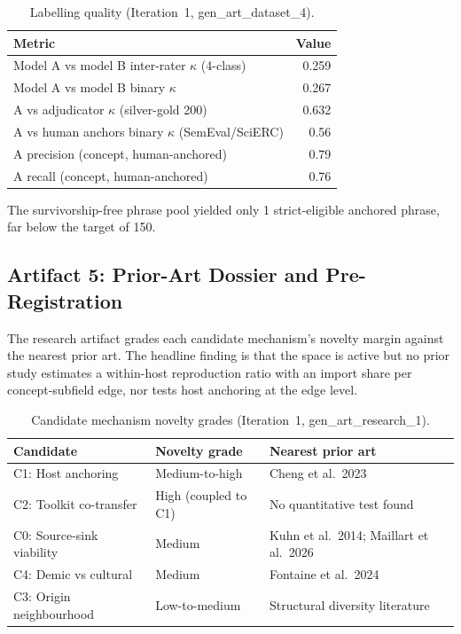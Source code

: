 \documentclass[11pt,letterpaper]{article}
\begin{document}
\begin{table}[!htbp]
\centering
\caption{Labelling quality (Iteration~1, gen\_art\_dataset\_4).}
\label{tab:labelling}
\begin{tabular}{L{6cm}r}
\toprule
Metric & Value \\
\midrule
Model A vs model B inter-rater $\kappa$ (4-class) & 0.259 \\
Model A vs model B binary $\kappa$ & 0.267 \\
A vs adjudicator $\kappa$ (silver-gold 200) & 0.632 \\
A vs human anchors binary $\kappa$ (SemEval/SciERC) & 0.56 \\
A precision (concept, human-anchored) & 0.79 \\
A recall (concept, human-anchored) & 0.76 \\
\bottomrule
\end{tabular}
\end{table}

The survivorship-free phrase pool yielded only 1 strict-eligible anchored phrase, far below the target of 150.

\subsection{Artifact 5: Prior-Art Dossier and Pre-Registration}

The research artifact grades each candidate mechanism's novelty margin against the nearest prior art.
The headline finding is that the space is active but no prior study estimates a within-host reproduction ratio with an import share per concept-subfield edge, nor tests host anchoring at the edge level.

\begin{table}[!htbp]
\centering
\caption{Candidate mechanism novelty grades (Iteration~1, gen\_art\_research\_1).}
\label{tab:novelty}
\begin{tabular}{L{3.5cm}L{2.5cm}L{4cm}}
\toprule
Candidate & Novelty grade & Nearest prior art \\
\midrule
C1: Host anchoring & Medium-to-high & Cheng et al.\ 2023 \\
C2: Toolkit co-transfer & High (coupled to C1) & No quantitative test found \\
C0: Source-sink viability & Medium & Kuhn et al.\ 2014; Maillart et al.\ 2026 \\
C4: Demic vs cultural & Medium & Fontaine et al.\ 2024 \\
C3: Origin neighbourhood & Low-to-medium & Structural diversity literature \\
\bottomrule
\end{tabular}
\end{table}
\end{document}
